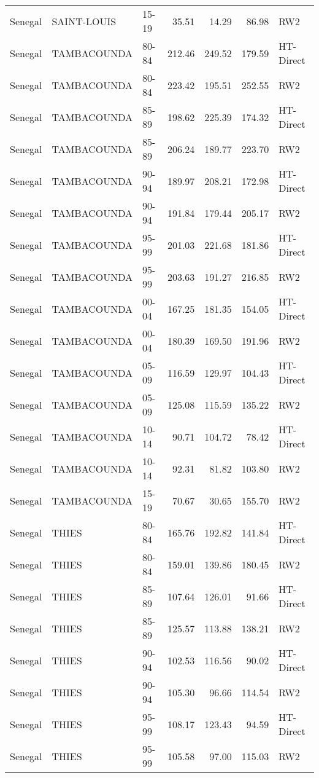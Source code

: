 \begin{longtable}{lllrrrl}
  Senegal & SAINT-LOUIS & 15-19 & 35.51 & 14.29 & 86.98 & RW2 \\ 
  Senegal & TAMBACOUNDA & 80-84 & 212.46 & 249.52 & 179.59 & HT-Direct \\ 
  Senegal & TAMBACOUNDA & 80-84 & 223.42 & 195.51 & 252.55 & RW2 \\ 
  Senegal & TAMBACOUNDA & 85-89 & 198.62 & 225.39 & 174.32 & HT-Direct \\ 
  Senegal & TAMBACOUNDA & 85-89 & 206.24 & 189.77 & 223.70 & RW2 \\ 
  Senegal & TAMBACOUNDA & 90-94 & 189.97 & 208.21 & 172.98 & HT-Direct \\ 
  Senegal & TAMBACOUNDA & 90-94 & 191.84 & 179.44 & 205.17 & RW2 \\ 
  Senegal & TAMBACOUNDA & 95-99 & 201.03 & 221.68 & 181.86 & HT-Direct \\ 
  Senegal & TAMBACOUNDA & 95-99 & 203.63 & 191.27 & 216.85 & RW2 \\ 
  Senegal & TAMBACOUNDA & 00-04 & 167.25 & 181.35 & 154.05 & HT-Direct \\ 
  Senegal & TAMBACOUNDA & 00-04 & 180.39 & 169.50 & 191.96 & RW2 \\ 
  Senegal & TAMBACOUNDA & 05-09 & 116.59 & 129.97 & 104.43 & HT-Direct \\ 
  Senegal & TAMBACOUNDA & 05-09 & 125.08 & 115.59 & 135.22 & RW2 \\ 
  Senegal & TAMBACOUNDA & 10-14 & 90.71 & 104.72 & 78.42 & HT-Direct \\ 
  Senegal & TAMBACOUNDA & 10-14 & 92.31 & 81.82 & 103.80 & RW2 \\ 
  Senegal & TAMBACOUNDA & 15-19 & 70.67 & 30.65 & 155.70 & RW2 \\ 
  Senegal & THIES & 80-84 & 165.76 & 192.82 & 141.84 & HT-Direct \\ 
  Senegal & THIES & 80-84 & 159.01 & 139.86 & 180.45 & RW2 \\ 
  Senegal & THIES & 85-89 & 107.64 & 126.01 & 91.66 & HT-Direct \\ 
  Senegal & THIES & 85-89 & 125.57 & 113.88 & 138.21 & RW2 \\ 
  Senegal & THIES & 90-94 & 102.53 & 116.56 & 90.02 & HT-Direct \\ 
  Senegal & THIES & 90-94 & 105.30 & 96.66 & 114.54 & RW2 \\ 
  Senegal & THIES & 95-99 & 108.17 & 123.43 & 94.59 & HT-Direct \\ 
  Senegal & THIES & 95-99 & 105.58 & 97.00 & 115.03 & RW2 \\ 

\end{longtable}
